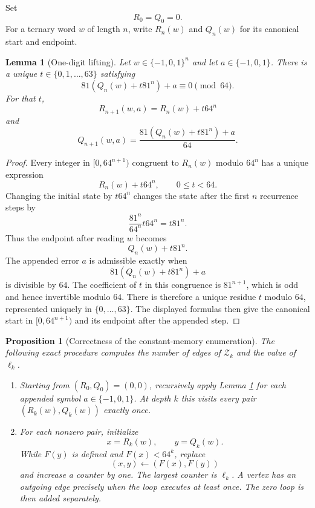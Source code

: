 \documentclass[11pt]{article}
\newtheorem{lemma}[theorem]{Lemma}
\newtheorem{proposition}[theorem]{Proposition}
\theoremstyle{definition}
\theoremstyle{remark}
\begin{document}
Set
\[
R_0=Q_0=0.
\]
For a ternary word $w$ of length $n$, write $R_n(w)$ and $Q_n(w)$ for its canonical start and endpoint.

\begin{lemma}[One-digit lifting]
\label{lem:lifting}
Let $w\in\{-1,0,1\}^n$ and let $a\in\{-1,0,1\}$. There is a unique $t\in\{0,1,\ldots,63\}$ satisfying
\[
81\left(Q_n(w)+t81^n\right)+a\equiv0\pmod{64}.
\]
For that $t$,
\[
R_{n+1}(w,a)=R_n(w)+t64^n
\]
and
\[
Q_{n+1}(w,a)
=
\frac{81\left(Q_n(w)+t81^n\right)+a}{64}.
\]
\end{lemma}

\begin{proof}
Every integer in $[0,64^{n+1})$ congruent to $R_n(w)$ modulo $64^n$ has a unique expression
\[
R_n(w)+t64^n,
\qquad 0\le t<64.
\]
Changing the initial state by $t64^n$ changes the state after the first $n$ recurrence steps by
\[
\frac{81^n}{64^n}t64^n=t81^n.
\]
Thus the endpoint after reading $w$ becomes
\[
Q_n(w)+t81^n.
\]
The appended error $a$ is admissible exactly when
\[
81\left(Q_n(w)+t81^n\right)+a
\]
is divisible by $64$. The coefficient of $t$ in this congruence is $81^{n+1}$, which is odd and hence invertible modulo $64$. There is therefore a unique residue $t$ modulo $64$, represented uniquely in $\{0,\ldots,63\}$. The displayed formulas then give the canonical start in $[0,64^{n+1})$ and its endpoint after the appended step.
\end{proof}

\begin{proposition}[Correctness of the constant-memory enumeration]
\label{prop:algorithm}
The following exact procedure computes the number of edges of $\mathcal Z_k$ and the value of $\ell_k$.

\begin{enumerate}
\item Starting from $(R_0,Q_0)=(0,0)$, recursively apply Lemma \ref{lem:lifting} for each appended symbol $a\in\{-1,0,1\}$. At depth $k$ this visits every pair $(R_k(w),Q_k(w))$ exactly once.
\item For each nonzero pair, initialize
\[
x=R_k(w),\qquad y=Q_k(w).
\]
While $F(y)$ is defined and $F(x)<64^k$, replace
\[
(x,y)\longleftarrow(F(x),F(y))
\]
and increase a counter by one. The largest counter is $\ell_k$. A vertex has an outgoing edge precisely when the loop executes at least once. The zero loop is then added separately.
\end{enumerate}
\end{proposition}
\end{document}
